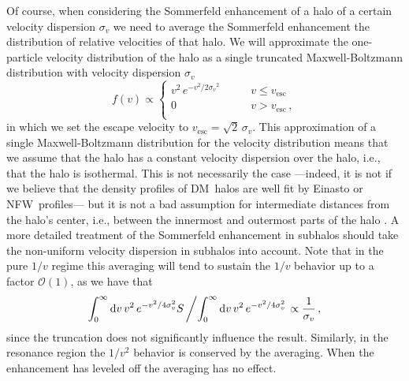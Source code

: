 \documentclass[aps,prd,twocolumn,amsmath,amssymb,floatfix,nofootinbib,10pt]{revtex4}
\newcommand{\ie}{i.e.}
\newcommand{\NFW}{NFW}
\newcommand{\DM}{DM}
\newcommand{\somm}{\ensuremath{S}}
\newcommand{\dd}{\mathrm{d}}
\newcommand{\order}{\ensuremath{\mathcal{O}}}
\newcommand{\sigv}{\ensuremath{\sigma_v}}
\begin{document}
Of course, when considering the Sommerfeld enhancement of a halo of a
certain velocity dispersion $\sigv$ we need to average the Sommerfeld
enhancement the distribution of relative velocities of that halo. We
will approximate the one-particle velocity distribution of the halo as
a single truncated Maxwell-Boltzmann distribution with velocity
dispersion $\sigv$
\begin{equation}\label{eq:maxboltz}
f(v) \propto \left\{
\begin{array}{rl}
v^2\, e^{-v^2/2\sigv^2}  & \qquad v \leq v_{\mathrm{esc}}\\
0 & \qquad v > v_{\mathrm{esc}}\, ,\\
\end{array} \right.
\end{equation}
in which we set the escape velocity to $v_{\mathrm{esc}} =
\sqrt{2}\,\sigv$. This approximation of a single Maxwell-Boltzmann
distribution for the velocity distribution means that we assume that
the halo has a constant velocity dispersion over the halo, \ie, that
the halo is isothermal. This is not necessarily the case ---indeed, it
is not if we believe that the density profiles of \DM\ halos are well
fit by Einasto or \NFW\ profiles--- but it is not a bad assumption for
intermediate distances from the halo's center, \ie, between the
innermost and outermost parts of the halo
\cite{2007ApJ...667L..53W}. A more detailed treatment of the
Sommerfeld enhancement in subhalos should take the non-uniform
velocity dispersion in subhalos into account. Note that in the pure
$1/v$ regime this averaging will tend to sustain the $1/v$ behavior up
to a factor $\order(1)$, as we have that
\begin{equation}
\int_0^\infty \dd v \, v^2\, e^{-v^2/4\sigv^2}
\somm\left/\int_0^\infty \dd v \, v^2\, e^{-v^2/4\sigv^2} \right.\propto
\frac{1}{\sigv}\, ,
\end{equation}
since the truncation does not significantly influence the
result. Similarly, in the resonance region the $1/v^2$ behavior is
conserved by the averaging. When the enhancement has leveled off the
averaging has no effect.
\end{document}
